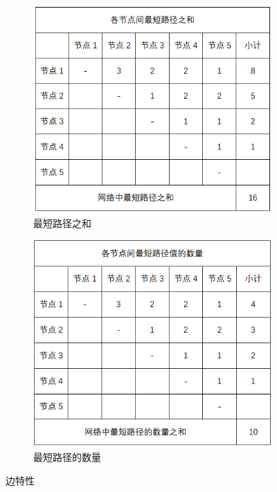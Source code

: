 \documentclass[bachelor,adobefonts]{jnuthesis}
\begin{document}
\begin{figure}[h!]
\begin{subfigure}[b]{0.49\linewidth}
      \includegraphics[width=\linewidth]{bian2.png}
      \caption{最短路径之和}
    \end{subfigure}
    \begin{subfigure}[b]{0.49\linewidth}
      \includegraphics[width=\linewidth]{bian3.png}
      \caption{最短路径的数量}
    \end{subfigure}
  \caption{边特性}
\end{figure}
\end{document}
